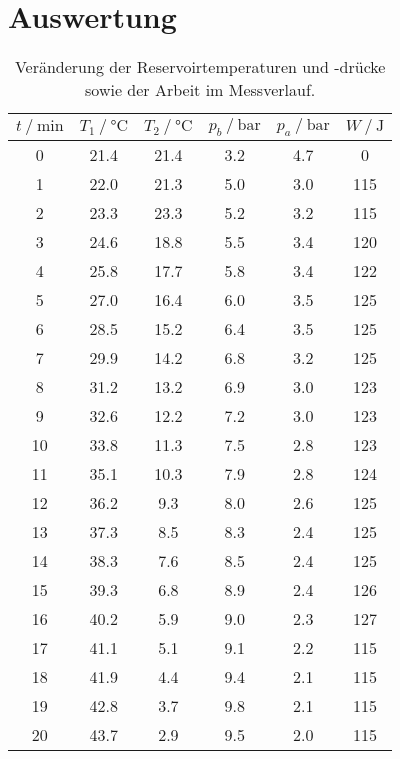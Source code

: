 \section{Auswertung}
\label{sec:Auswertung}


\begin{table}[H]
  \centering
  \caption{Veränderung der Reservoirtemperaturen und -drücke sowie der Arbeit im Messverlauf.}
  \label{tab:freiePendel}
  \begin{tabular}{S[table-format=2.0] S S S S S[table-format=3.0]}
    \toprule
    {$t \mathbin{/} \unit{\minute}$} 
    & {$T_1 \mathbin{/} \unit{\celsius}$} & {$T_2 \mathbin{/} \unit{\celsius}$} 
    & {$p_b \mathbin{/} \unit{\bar}$} & {$p_a \mathbin{/} \unit{\bar}$} 
    & {$W \mathbin{/} \unit{\joule}$} \\
     & 21.4 & 21.4 &  3.2 & 4.7 &   0 \\
     1 & 22.0 & 21.3 &  5.0 & 3.0 & 115 \\
     2 & 23.3 & 23.3 &  5.2 & 3.2 & 115 \\
     3 & 24.6 & 18.8 &  5.5 & 3.4 & 120 \\
     4 & 25.8 & 17.7 &  5.8 & 3.4 & 122 \\
     5 & 27.0 & 16.4 &  6.0 & 3.5 & 125 \\
     6 & 28.5 & 15.2 &  6.4 & 3.5 & 125 \\
     7 & 29.9 & 14.2 &  6.8 & 3.2 & 125 \\
     8 & 31.2 & 13.2 &  6.9 & 3.0 & 123 \\
     9 & 32.6 & 12.2 &  7.2 & 3.0 & 123 \\
    10 & 33.8 & 11.3 &  7.5 & 2.8 & 123 \\
    11 & 35.1 & 10.3 &  7.9 & 2.8 & 124 \\
    12 & 36.2 &  9.3 &  8.0 & 2.6 & 125 \\
    13 & 37.3 &  8.5 &  8.3 & 2.4 & 125 \\
    14 & 38.3 &  7.6 &  8.5 & 2.4 & 125 \\
    15 & 39.3 &  6.8 &  8.9 & 2.4 & 126 \\
    16 & 40.2 &  5.9 &  9.0 & 2.3 & 127 \\
    17 & 41.1 &  5.1 &  9.1 & 2.2 & 115 \\
    18 & 41.9 &  4.4 &  9.4 & 2.1 & 115 \\
    19 & 42.8 &  3.7 &  9.8 & 2.1 & 115 \\
    20 & 43.7 &  2.9 &  9.5 & 2.0 & 115 \\

\end{tabular}
\end{table}
